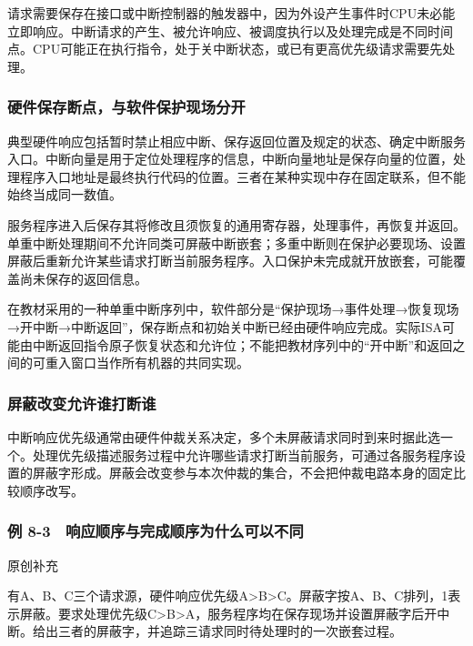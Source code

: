 请求需要保存在接口或中断控制器的触发器中，因为外设产生事件时CPU未必能立即响应。中断请求的产生、被允许响应、被调度执行以及处理完成是不同时间点。CPU可能正在执行指令，处于关中断状态，或已有更高优先级请求需要先处理。

\subsubsection{硬件保存断点，与软件保护现场分开}\label{ux786cux4ef6ux4fddux5b58ux65adux70b9ux4e0eux8f6fux4ef6ux4fddux62a4ux73b0ux573aux5206ux5f00}

典型硬件响应包括暂时禁止相应中断、保存返回位置及规定的状态、确定中断服务入口。中断向量是用于定位处理程序的信息，中断向量地址是保存向量的位置，处理程序入口地址是最终执行代码的位置。三者在某种实现中存在固定联系，但不能始终当成同一数值。

服务程序进入后保存其将修改且须恢复的通用寄存器，处理事件，再恢复并返回。单重中断处理期间不允许同类可屏蔽中断嵌套；多重中断则在保护必要现场、设置屏蔽后重新允许某些请求打断当前服务程序。入口保护未完成就开放嵌套，可能覆盖尚未保存的返回信息。

在教材采用的一种单重中断序列中，软件部分是``保护现场→事件处理→恢复现场→开中断→中断返回''，保存断点和初始关中断已经由硬件响应完成。实际ISA可能由中断返回指令原子恢复状态和允许位；不能把教材序列中的``开中断''和返回之间的可重入窗口当作所有机器的共同实现。

\subsubsection{屏蔽改变允许谁打断谁}\label{ux5c4fux853dux6539ux53d8ux5141ux8bb8ux8c01ux6253ux65adux8c01}

中断响应优先级通常由硬件仲裁关系决定，多个未屏蔽请求同时到来时据此选一个。处理优先级描述服务过程中允许哪些请求打断当前服务，可通过各服务程序设置的屏蔽字形成。屏蔽会改变参与本次仲裁的集合，不会把仲裁电路本身的固定比较顺序改写。

\subsubsection{例 8-3　响应顺序与完成顺序为什么可以不同}\label{co-ex8-3}

原创补充

有A、B、C三个请求源，硬件响应优先级A\textgreater B\textgreater C。屏蔽字按A、B、C排列，1表示屏蔽。要求处理优先级C\textgreater B\textgreater A，服务程序均在保存现场并设置屏蔽字后开中断。给出三者的屏蔽字，并追踪三请求同时待处理时的一次嵌套过程。

